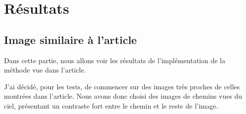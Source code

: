\documentclass{article}
\begin{document}
\section{Résultats}

\subsection{Image similaire à l'article}


Dans cette partie, nous allons voir les résultats de l'implémentation de la méthode
vue dans l'article.

J'ai décidé, pour les tests, de commencer sur des images très proches de celles
montrées dans l'article. Nous avons donc choisi des images de chemins vues du ciel,
présentant un contraste fort entre le chemin et le reste de l'image.
\end{document}
